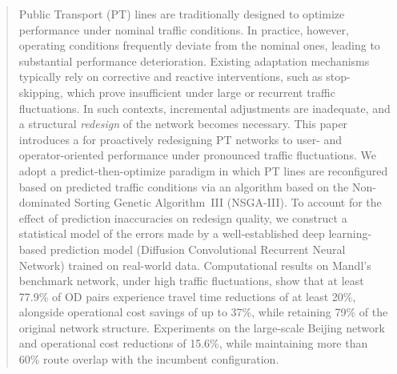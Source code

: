 \documentclass[a4paper,fleqn]{cas-sc}
\begin{document}

\begin{abstract}
Public Transport (PT) lines are traditionally designed to optimize performance under nominal traffic conditions. In practice, however, operating conditions frequently deviate from the nominal ones, leading to substantial performance deterioration. Existing adaptation mechanisms typically rely on corrective and reactive interventions, such as stop-skipping, which prove insufficient under large or recurrent traffic fluctuations. In such contexts, incremental adjustments are inadequate, and a structural \emph{redesign} of the network becomes necessary.
%
This paper introduces a  for proactively redesigning PT networks to  user- and operator-oriented performance under pronounced traffic fluctuations. We adopt a predict-then-optimize paradigm in which PT lines are reconfigured based on predicted traffic conditions via an algorithm based on the Non-dominated Sorting Genetic Algorithm~III (NSGA-III).
%
 To account for the effect of prediction inaccuracies on redesign quality, we construct a statistical model of the errors made by a well-established deep learning-based prediction model (Diffusion Convolutional Recurrent Neural Network) trained on real-world data.
%
Computational results on Mandl's benchmark network, under high traffic fluctuations, show that at least 77.9\% of OD pairs experience travel time reductions of at least 20\%, alongside operational cost savings of up to 37\%, while retaining 79\% of the original network structure. Experiments on the large-scale Beijing network  and operational cost reductions of 15.6\%, while maintaining more than 60\% route overlap with the incumbent configuration.
%
\end{abstract}
\end{document}
